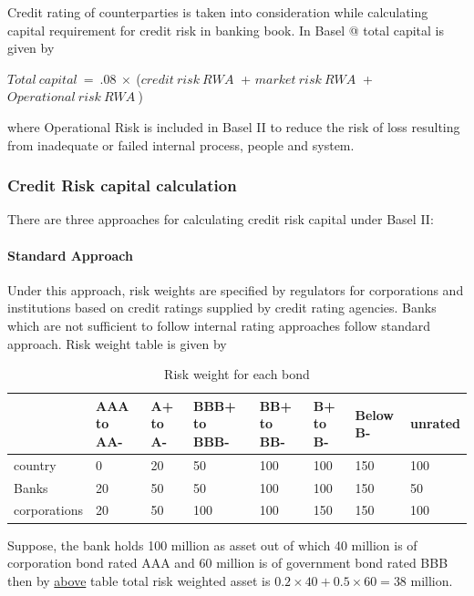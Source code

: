 \documentclass[11pt]{article}
\makeatletter
\newcommand{\Rmnum}[1]{\expandafter\@slowromancap\romannumeral #1@}
\numberwithin{equation}{section}
\makeatother
\begin{document}
Credit rating of counterparties is taken into consideration while calculating capital requirement for credit risk in banking book. In Basel \Rmnum{2} total capital is given by 
\begin{center}
$Total\: capital\: = \: .08\: \times \:  $($credit\: risk\: RWA \:$ + $market\: risk\: RWA \:$ + $Operational\: risk\: RWA \:$)
\end{center}

where Operational Risk is included in Basel II to reduce the risk of loss resulting from inadequate or failed internal process, people and system. 



\subsubsection{Credit Risk capital calculation}

There are three approaches for calculating credit risk capital under Basel II:
\paragraph{Standard Approach}\mbox{} 
\medskip

\hspace{1cm}Under this approach, risk weights are specified by regulators for corporations and institutions based on credit ratings supplied by credit rating agencies. Banks which are not sufficient to follow internal rating approaches follow standard approach. Risk weight table is given by
\begin{table}[H]
\begin{center}
\begin{tabular}{|p{2cm}|p{1.5cm}|p{1cm}|p{1.5cm}|p{1.5cm}| p{1cm}|p{1cm}|p{1.5cm}|}
\hline & AAA to AA- & A+ to A- & BBB+ to BBB- & BB+ to BB- & B+ to B- & Below B- & unrated\\
\hline country & 0 & 20 & 50 & 100 & 100 & 150 & 100\\
\hline Banks & 20 & 50 & 50 & 100 & 100 & 150 & 50\\
\hline corporations & 20 & 50 & 100 & 100 & 150 & 150 & 100\\
\hline
\end{tabular}
\end{center}
\caption{Risk weight for each bond}
\label{tab:q_1}
\end{table}


Suppose, the bank holds 100 million as asset out of which 40 million is of corporation bond rated AAA and 60 million is of government bond rated BBB then by \hyperref[tab:q_1]{above} table total risk weighted asset is $ 0.2\times40 + 0.5\times60 = 38 $ million. 
\end{document}
